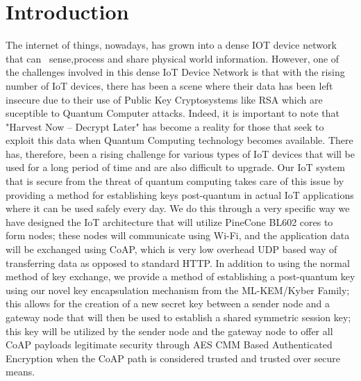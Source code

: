 \documentclass[USenglish,oneside,twocolumn]{article}
\begin{document}
\begin{abstract}
{        In order to verify that our protocol is functioning we also examined the traffic patterns using typical network analysis tools, e.g. Wireshark.In conclusion, this project provides a repeatable design methodology for developing a Quantum Resistant Key between a small CoAP-based device and an arbitrary other system. The project has involved a theoretical migration from a Concept design, then development of a Demonstration Prototype, then a Complete End-to-End Demonstration on a commercial IoT Board. This set of components can also be leveraged for other similar platforms. }
	\end{abstract}
	\maketitle

	\section{Introduction}
    The internet of things, nowadays, has grown into a dense IOT device network that can  sense,process and share physical world information. However, one of the challenges involved in this dense IoT Device Network is that with the rising number of IoT devices, there has been a scene where their data has been left insecure due to their use of Public Key Cryptosystems like RSA which are suceptible to Quantum Computer attacks. Indeed, it is important to note that "Harvest Now – Decrypt Later" has become a reality for those that seek to exploit this data when Quantum Computing technology becomes available. There has, therefore, been a rising challenge for various types of IoT devices that will be used for a long period of time and are also difficult to upgrade.
    Our IoT system that is secure from the threat of quantum computing takes care of this issue by providing a method for establishing keys post-quantum in actual IoT applications where it can be used safely every day. We do this through a very specific way we have designed the IoT architecture that will utilize PineCone BL602 cores to form nodes; these nodes will communicate using Wi-Fi, and the application data will be exchanged using CoAP, which is very low overhead UDP based way of transferring data as opposed to standard HTTP. In addition to using the normal method of key exchange, we provide a method of establishing a post-quantum key using our novel key encapsulation mechanism from the ML-KEM/Kyber Family; this allows for the creation of a new secret key between a sender node and a gateway node that will then be used to establish a shared symmetric session key; this key will be utilized by the sender node and the gateway node to offer all CoAP payloads legitimate security through AES CMM Based Authenticated Encryption when the CoAP path is considered trusted and trusted over secure means.
\end{document}
